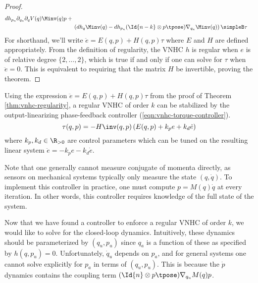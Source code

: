 \begin{proof}
\begin{align*}
     dh_{p_u} \partial_{q_u}\partial_q V(q)\Minv(q)p +{} \\
     & \left(dh_q \Minv(q) - dh_{p_u}(\Id{n-k} \otimes
     p\tpose)\nabla_{q_u}\Minv(q) \right) \simpleB \tau
    \end{align*}
    For shorthand, we'll write \(\ddot{e} = E(q,p) + H(q,p)\tau\) where \(E\)
    and \(H\) are defined appropriately.
    From the definition of regularity, the VNHC \(h\) is regular 
    when \(e\) is of relative degree \(\{2,\ldots,2\}\), which is true 
    if and only if
    one can solve for \(\tau\) when \(\ddot{e} = 0\).
    This is equivalent to requiring that the matrix \(H\) be
    invertible,
    proving the theorem.
\end{proof}

Using the expression \(\ddot{e} = E(q,p) + H(q,p)\tau\) from the proof of 
Theorem \ref{thm:vnhc-regularity}, a regular VNHC of order \(k\) can be
stabilized by the output-linearizing phase-feedback controller
(\ref{eqn:vnhc-torque-controller}).
\begin{equation}\label{eqn:vnhc-torque-controller}
    \tau(q,p) = -H\inv(q,p)\left(E(q,p) + k_p e + k_d \dot{e}\right)
\end{equation}
where \(k_p, k_d \in \R_{>0}\) are control parameters which can be tuned on the
resulting linear system \(\ddot{e} = -k_p e - k_d\dot{e}\). 

Note that one generally cannot measure conjugate of momenta directly, as sensors
on mechanical systems typically only measure the state \((q,\dot{q})\). To
implement this controller in practice, one must compute \(p = M(q)\dot{q}\) at
every iteration. In other words, this controller requires knowledge of the full
state of the system.


Now that we have found a controller to enforce a regular VNHC of order \(k\), we
would like to solve for the closed-loop dynamics. Intuitively, these dynamics
should be parameterized by \((q_u, p_u)\) since \(q_a\) is a function of these
as specified by \(h(q,p_u) = 0\).
Unfortunately, \(\dot{q}_u\) depends on \(p_a\), and for general systems one
cannot solve explicitly for \(p_a\) in terms of \((q_u,p_u)\). This is because
the \(\dot{p}\) dynamics contains the coupling term 
\((\Id{n} \otimes p\tpose)\nabla_{q_u}M(q)p\). 

